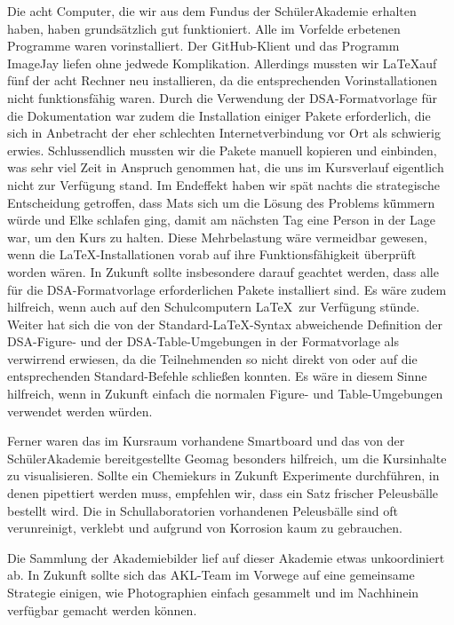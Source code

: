 \documentclass{scrartcl}
\begin{document}
Die acht Computer, die wir aus dem Fundus der Sch{\"u}lerAkademie erhalten haben,
haben grunds{\"a}tzlich gut funktioniert. Alle im Vorfelde erbetenen Programme
waren vorinstalliert. Der GitHub-Klient und das Programm ImageJay liefen ohne
jedwede Komplikation. Allerdings mussten wir \LaTeX auf f{\"u}nf der acht
Rechner neu installieren, da die entsprechenden Vorinstallationen nicht
funktionsf{\"a}hig waren. Durch die Verwendung der DSA-Formatvorlage f{\"u}r
die Dokumentation war zudem die Installation einiger Pakete erforderlich, die
sich in Anbetracht der eher schlechten Internetverbindung vor Ort als schwierig
erwies. Schlussendlich mussten wir die Pakete manuell kopieren und einbinden,
was sehr viel Zeit in Anspruch genommen hat, die uns im Kursverlauf eigentlich
nicht zur Verf{\"u}gung stand.
Im Endeffekt haben wir sp{\"a}t nachts die strategische Entscheidung getroffen,
dass Mats sich um die L{\"o}sung des Problems k{\"ü}mmern w{\"u}rde und Elke
schlafen ging, damit am n{\"a}chsten Tag eine Person in der Lage war, um den
Kurs zu halten.
Diese Mehrbelastung w{\"a}re vermeidbar gewesen, wenn die
\LaTeX -Installationen vorab auf ihre Funktionsf{\"a}higkeit {\"u}berpr{\"u}ft
worden w{\"a}ren. In Zukunft sollte insbesondere darauf geachtet werden, dass
alle f{\"u}r die DSA-Formatvorlage erforderlichen Pakete installiert sind. Es
w{\"a}re zudem hilfreich, wenn auch auf den Schulcomputern \LaTeX\ zur
Verf{\"u}gung st{\"u}nde. Weiter hat sich die von der Standard-\LaTeX -Syntax
abweichende Definition der DSA-Figure- und der DSA-Table-Umgebungen in der
Formatvorlage als verwirrend erwiesen, da die Teilnehmenden so nicht direkt von
oder auf die entsprechenden Standard-Befehle schlie{\ss}en konnten. Es w{\"a}re
in diesem Sinne hilfreich, wenn in Zukunft einfach die normalen Figure- und
Table-Umgebungen verwendet werden w{\"u}rden.\medskip

Ferner waren das im Kursraum vorhandene Smartboard und das von der Sch{\"u}lerAkademie bereitgestellte Geomag besonders hilfreich, um die Kursinhalte zu visualisieren.
Sollte ein Chemiekurs in Zukunft Experimente durchf{\"u}hren, in denen pipettiert werden muss, empfehlen wir, dass ein Satz frischer Peleusb{\"a}lle bestellt wird. Die in Schullaboratorien vorhandenen Peleusb{\"a}lle sind oft verunreinigt,
verklebt und aufgrund von Korrosion kaum zu gebrauchen.\medskip

Die Sammlung der Akademiebilder lief auf dieser Akademie etwas
unkoordiniert ab. In Zukunft sollte sich das AKL-Team im Vorwege auf eine
gemeinsame Strategie einigen, wie Photographien einfach gesammelt und
im Nachhinein verf{\"u}gbar
gemacht werden k{\"o}nnen.\bigskip
\end{document}
